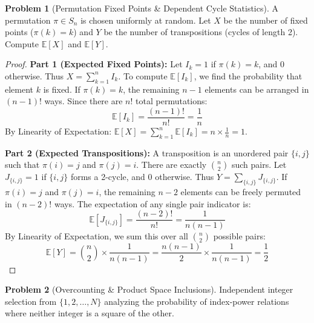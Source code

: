 \documentclass[11pt, a4paper]{article}
\theoremstyle{definition}
\newtheorem{problem}{Problem}
\theoremstyle{plain}
\begin{document}
\vspace{0.5cm}

\begin{problem}[Permutation Fixed Points \& Dependent Cycle Statistics]
A permutation $\pi \in S_n$ is chosen uniformly at random. Let $X$ be the number of fixed points ($\pi(k) = k$) and $Y$ be the number of transpositions (cycles of length 2). Compute $\mathbb{E}[X]$ and $\mathbb{E}[Y]$.
\end{problem}

\begin{proof}
\textbf{Part 1 (Expected Fixed Points):} Let $I_k = 1$ if $\pi(k) = k$, and $0$ otherwise. Thus $X = \sum_{k=1}^n I_k$.
To compute $\mathbb{E}[I_k]$, we find the probability that element $k$ is fixed. If $\pi(k) = k$, the remaining $n - 1$ elements can be arranged in $(n - 1)!$ ways. Since there are $n!$ total permutations:
\[
\mathbb{E}[I_k] = \frac{(n - 1)!}{n!} = \frac{1}{n}
\]
By Linearity of Expectation: $\mathbb{E}[X] = \sum_{k=1}^n \mathbb{E}[I_k] = n \times \frac{1}{n} = 1$.

\textbf{Part 2 (Expected Transpositions):} A transposition is an unordered pair $\{i, j\}$ such that $\pi(i) = j$ and $\pi(j) = i$. There are exactly $\binom{n}{2}$ such pairs. Let $J_{\{i,j\}} = 1$ if $\{i,j\}$ forms a 2-cycle, and $0$ otherwise. Thus $Y = \sum_{\{i,j\}} J_{\{i,j\}}$.
If $\pi(i) = j$ and $\pi(j) = i$, the remaining $n - 2$ elements can be freely permuted in $(n - 2)!$ ways. The expectation of any single pair indicator is:
\[
\mathbb{E}[J_{\{i,j\}}] = \frac{(n - 2)!}{n!} = \frac{1}{n(n - 1)}
\]
By Linearity of Expectation, we sum this over all $\binom{n}{2}$ possible pairs:
\[
\mathbb{E}[Y] = \binom{n}{2} \times \frac{1}{n(n - 1)} = \frac{n(n - 1)}{2} \times \frac{1}{n(n - 1)} = \frac{1}{2}
\]
\end{proof}

\vspace{0.5cm}

\begin{problem}[Overcounting \& Product Space Inclusions]
Independent integer selection from $\{1, 2, \dots, N\}$ analyzing the probability of index-power relations where neither integer is a square of the other.
\end{problem}
\end{document}
